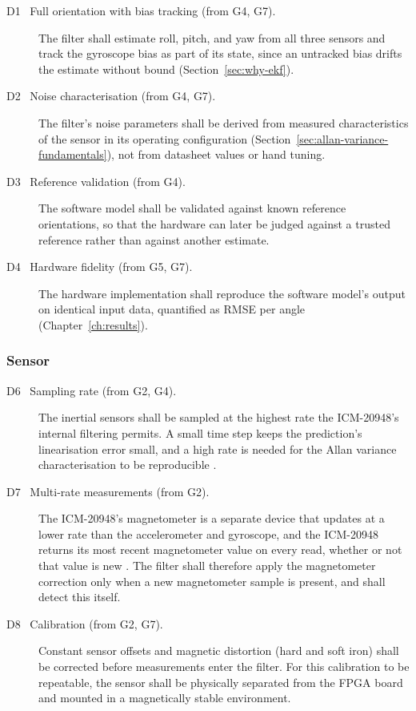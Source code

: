 \documentclass[12pt,a4paper]{article}
\begin{document}
\begin{description}
  \item[D1 \ Full orientation with bias tracking (from G4, G7).]
        The filter shall estimate roll, pitch, and yaw from all three
        sensors and track the gyroscope bias as part of its state,
        since an untracked bias drifts the estimate without bound
        (Section~\ref{sec:why-ekf}).
  \item[D2 \ Noise characterisation (from G4, G7).] The filter's
        noise parameters shall be derived from measured
        characteristics of the sensor in its operating configuration
        (Section~\ref{sec:allan-variance-fundamentals}), not from
        datasheet values or hand tuning.
  \item[D3 \ Reference validation (from G4).] The software model
        shall be validated against known reference orientations, so
        that the hardware can later be judged against a trusted
        reference rather than against another estimate.
  \item[D4 \ Hardware fidelity (from G5, G7).] The hardware
        implementation shall reproduce the software model's output
        on identical input data, quantified as RMSE per angle
        (Chapter~\ref{ch:results}).

\end{description}

\subsubsection{Sensor}

\begin{description}
  \item[D6 \ Sampling rate (from G2, G4).] The inertial sensors
        shall be sampled at the highest rate the ICM-20948's
        internal filtering permits. A small time step keeps the
        prediction's linearisation error small, and a high rate is
        needed for the Allan variance characterisation to be
        reproducible \citep{elsheimy2008analysis}.
  \item[D7 \ Multi-rate measurements (from G2).] The ICM-20948's
        magnetometer is a separate device that updates at a lower
        rate than the accelerometer and gyroscope, and the ICM-20948
        returns its most recent magnetometer value on every read,
        whether or not that value is new \citep{tdk_icm20948_ds}.
        The filter shall therefore apply the magnetometer correction
        only when a new magnetometer sample is present, and shall
        detect this itself.
  \item[D8 \ Calibration (from G2, G7).] Constant sensor offsets and
        magnetic distortion (hard and soft iron) shall be corrected
        before measurements enter the filter. For this calibration
        to be repeatable, the sensor shall be physically separated
        from the FPGA board and mounted in a magnetically stable
        environment.
\end{description}
\end{document}
